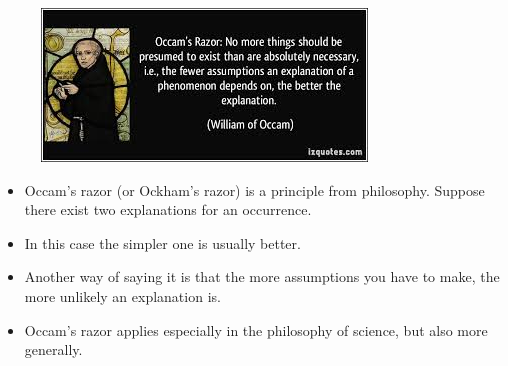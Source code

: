 \documentclass[PredictiveAnalytics101.tex]{subfiles}
\begin{document}
\begin{frame}
	\begin{figure}
\centering
\includegraphics[width=0.99\linewidth]{occamrazor}


\end{figure}

\end{frame}
\begin{frame}
\begin{itemize}
\item Occam's razor (or Ockham's razor) is a principle from philosophy. Suppose there exist two explanations for an occurrence. \item In this case the simpler one is usually better. 
\item Another way of saying it is that the more assumptions you have to make, the more unlikely an explanation is. 
\item Occam's razor applies especially in the philosophy of science, but also more generally.
\end{itemize}
\end{frame}
\end{document}
